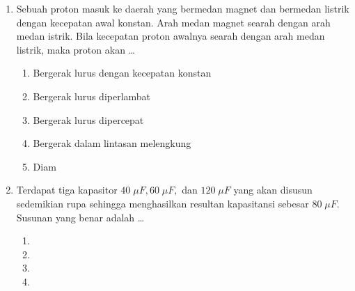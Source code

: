 \documentclass[A4,12PT, english, twocolumn]{journal}
\begin{document}
\begin{enumerate}
\item Sebuah proton masuk ke daerah yang bermedan magnet dan bermedan listrik dengan kecepatan awal konstan. Arah medan magnet searah dengan arah medan istrik. Bila kecepatan proton awalnya searah dengan arah medan listrik, maka proton akan \dots
   \begin{enumerate}
        \item Bergerak lurus dengan kecepatan konstan
        \item Bergerak lurus diperlambat
        \item Bergerak lurus dipercepat
        \item Bergerak dalam lintasan melengkung
        \item Diam
   \end{enumerate}
   
\item Terdapat tiga kapasitor $40 \; \mu F, 60 \; \mu F,$ dan $120 \; \mu F$ yang akan disusun sedemikian rupa sehingga menghasilkan resultan kapasitansi sebesar $80 \; \mu F$. Susunan yang benar adalah \dots
    \begin{enumerate}
        \item
        \item 
        \item 
        \item 
             \begin{tikzpicture}[baseline]

\end{tikzpicture}
\end{enumerate}
\end{enumerate}
\end{document}
